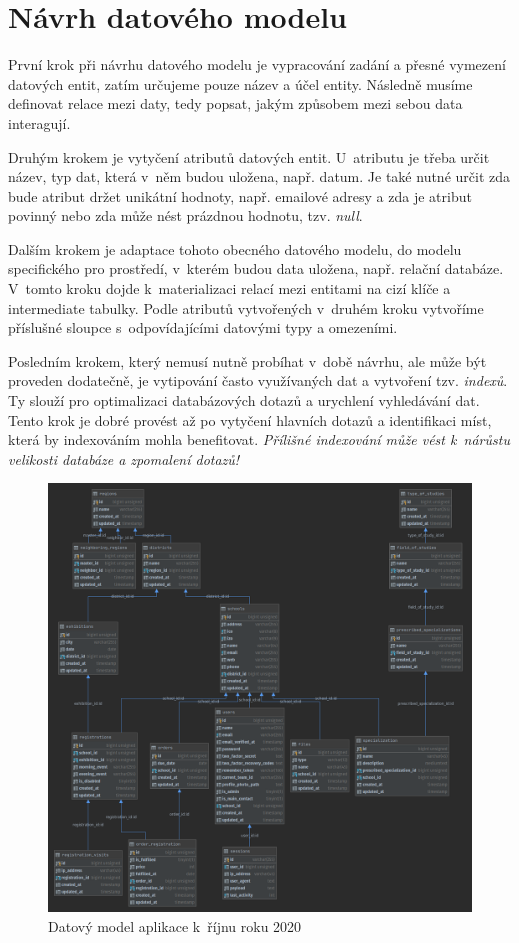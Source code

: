 \section{Návrh datového modelu}
\label{sub:data-model}

První krok\cite{data-model} při návrhu datového modelu je vypracování zadání a přesné vymezení datových entit, zatím určujeme pouze název a účel entity. Následně musíme definovat relace mezi daty, tedy popsat, jakým způsobem mezi sebou data interagují.

Druhým krokem je vytyčení atributů datových entit. U~atributu je třeba určit název, typ dat, která v~něm budou uložena, např. datum. Je také nutné určit zda bude atribut držet unikátní hodnoty, např. emailové adresy a zda je atribut povinný nebo zda může nést prázdnou hodnotu, tzv. \emph{null}\cite{null}.

Dalším krokem je adaptace tohoto obecného datového modelu, do modelu specifického pro prostředí, v~kterém budou data uložena, např. relační databáze. V~tomto kroku dojde k~materializaci relací mezi entitami na cizí klíče a intermediate tabulky\cite{intermediate-table}. Podle atributů vytvořených v~druhém kroku vytvoříme příslušné sloupce s~odpovídajícími datovými typy a omezeními. 

Posledním krokem, který nemusí nutně probíhat v~době návrhu, ale může být proveden dodatečně, je vytipování často využívaných dat a vytvoření tzv. \emph{indexů}\cite{index}. Ty slouží pro optimalizaci databázových dotazů a urychlení vyhledávání dat. Tento krok je dobré provést až po vytyčení hlavních dotazů a identifikaci míst, která by indexováním mohla benefitovat. \emph{Přílišné indexování může vést k~nárůstu velikosti databáze a zpomalení dotazů!}\cite{bad-indexing}

\begin{figure}[h]
\centering
\includegraphics[width=\textwidth]{img/datovy-model-rijen-2020-2.png}
\caption{Datový model aplikace \bso  k~říjnu roku 2020}
\label{fig:data-model-2020}
\end{figure}

